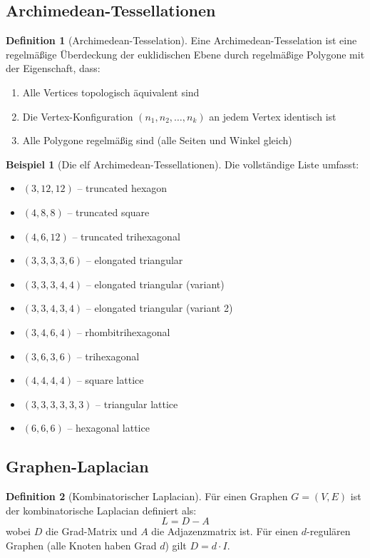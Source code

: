 \documentclass[a4paper,12pt]{article}
\theoremstyle{definition}
\newtheorem{definition}{Definition}[section]
\newtheorem{beispiel}{Beispiel}[section]
\begin{document}
\subsection{Archimedean-Tessellationen}

\begin{definition}[Archimedean-Tesselation]
	Eine Archimedean-Tesselation ist eine regelmäßige Überdeckung der euklidischen Ebene durch regelmäßige Polygone mit der Eigenschaft, dass:
	\begin{enumerate}
		\item Alle Vertices topologisch äquivalent sind
		\item Die Vertex-Konfiguration $(n_1, n_2, \ldots, n_k)$ an jedem Vertex identisch ist
		\item Alle Polygone regelmäßig sind (alle Seiten und Winkel gleich)
	\end{enumerate}
\end{definition}

\begin{beispiel}[Die elf Archimedean-Tessellationen]
	Die vollständige Liste umfasst:
	\begin{itemize}
		\item $(3,12,12)$ -- truncated hexagon
		\item $(4,8,8)$ -- truncated square
		\item $(4,6,12)$ -- truncated trihexagonal
		\item $(3,3,3,3,6)$ -- elongated triangular
		\item $(3,3,3,4,4)$ -- elongated triangular (variant)
		\item $(3,3,4,3,4)$ -- elongated triangular (variant 2)
		\item $(3,4,6,4)$ -- rhombitrihexagonal
		\item $(3,6,3,6)$ -- trihexagonal
		\item $(4,4,4,4)$ -- square lattice
		\item $(3,3,3,3,3,3)$ -- triangular lattice
		\item $(6,6,6)$ -- hexagonal lattice
	\end{itemize}
\end{beispiel}

\subsection{Graphen-Laplacian}

\begin{definition}[Kombinatorischer Laplacian]
	Für einen Graphen $G = (V, E)$ ist der kombinatorische Laplacian definiert als:
	\[
	L = D - A
	\]
	wobei $D$ die Grad-Matrix und $A$ die Adjazenzmatrix ist. Für einen $d$-regulären Graphen (alle Knoten haben Grad $d$) gilt $D = d \cdot I$.
\end{definition}
\end{document}
